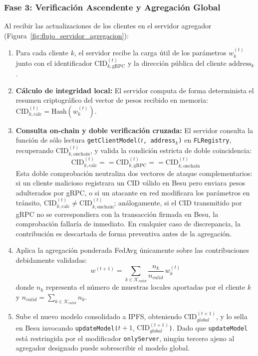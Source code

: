 \subsubsection{Fase 3: Verificación Ascendente y Agregación Global}
Al recibir las actualizaciones de los clientes en el servidor agregador (Figura~\ref{fig:flujo_servidor_agregacion}):
\begin{enumerate}
    \item Para cada cliente $k$, el servidor recibe la carga útil de los parámetros $w_k^{(t)}$ junto con el identificador $\text{CID}_{k,\text{gRPC}}^{(t)}$ y la dirección pública del cliente $\text{address}_k$.
    \item \textbf{Cálculo de integridad local:} El servidor computa de forma determinista el resumen criptográfico del vector de pesos recibido en memoria: $\text{CID}_{k,\text{calc}}^{(t)} = \text{Hash}(w_k^{(t)})$.
    \item \textbf{Consulta on-chain y doble verificación cruzada:} El servidor consulta la función de sólo lectura \texttt{getClientModel($t$, address$_k$)} en \texttt{FLRegistry}, recuperando $\text{CID}_{k,\text{onchain}}^{(t)}$, y valida la condición estricta de doble coincidencia:
    \begin{equation}
    \text{CID}_{k,\text{calc}}^{(t)} == \text{CID}_{k,\text{gRPC}}^{(t)} == \text{CID}_{k,\text{onchain}}^{(t)}
    \end{equation}
    Esta doble comprobación neutraliza dos vectores de ataque complementarios: si un cliente malicioso registrara un CID válido en Besu pero enviara pesos adulterados por gRPC, o si un atacante en red modificara los parámetros en tránsito, $\text{CID}_{k,\text{calc}}^{(t)} \neq \text{CID}_{k,\text{onchain}}^{(t)}$; análogamente, si el CID transmitido por gRPC no se correspondiera con la transacción firmada en Besu, la comprobación fallaría de inmediato. En cualquier caso de discrepancia, la contribución es descartada de forma preventiva antes de la agregación.
    \item Aplica la agregación ponderada FedAvg únicamente sobre las contribuciones debidamente validadas:
    \begin{equation}
    w^{(t+1)} = \sum_{k \in \mathcal{K}_{valid}} \frac{n_k}{n_{valid}} \, w_k^{(t)}
    \end{equation}
    donde $n_k$ representa el número de muestras locales aportadas por el cliente $k$ y $n_{valid} = \sum_{k \in \mathcal{K}_{valid}} n_k$.
    \item Sube el nuevo modelo consolidado a IPFS, obteniendo $\text{CID}_{global}^{(t+1)}$, y lo sella en Besu invocando \texttt{updateModel(}$t+1$, $\text{CID}_{global}^{(t+1)}$\texttt{)}. Dado que \texttt{updateModel} está restringida por el modificador \texttt{onlyServer}, ningún tercero ajeno al agregador designado puede sobrescribir el modelo global.
\end{enumerate}

